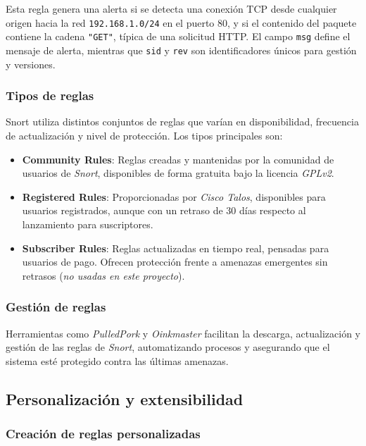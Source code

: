 \documentclass[11pt,a4paper,twoside]{report}
\begin{document}
Esta regla genera una alerta si se detecta una conexión TCP desde cualquier origen hacia la red \texttt{192.168.1.0/24} en el puerto 80, y si el contenido del paquete contiene la cadena \texttt{"GET"}, típica de una solicitud HTTP. El campo \texttt{msg} define el mensaje de alerta, mientras que \texttt{sid} y \texttt{rev} son identificadores únicos para gestión y versiones.


\subsubsection{Tipos de reglas}

Snort utiliza distintos conjuntos de reglas que varían en disponibilidad, frecuencia de actualización y nivel de protección. Los tipos principales son:

\begin{itemize}
	\item \textbf{Community Rules}: Reglas creadas y mantenidas por la comunidad de usuarios de \textit{Snort}, disponibles de forma gratuita bajo la licencia \textit{GPLv2}.
	
	\item \textbf{Registered Rules}: Proporcionadas por \textit{Cisco Talos}, disponibles para usuarios registrados, aunque con un retraso de 30 días respecto al lanzamiento para suscriptores.
	
	\item \textbf{Subscriber Rules}: Reglas actualizadas en tiempo real, pensadas para usuarios de pago. Ofrecen protección frente a amenazas emergentes sin retrasos \cite{snort_talos} (\textit{no usadas en este proyecto}).
\end{itemize}


\subsubsection{Gestión de reglas}

Herramientas como \textit{PulledPork} y \textit{Oinkmaster} facilitan la descarga, actualización y gestión de las reglas de \textit{Snort}, automatizando procesos y asegurando que el sistema esté protegido contra las últimas amenazas.

\subsection{Personalización y extensibilidad}

\subsubsection{Creación de reglas personalizadas}
\end{document}
